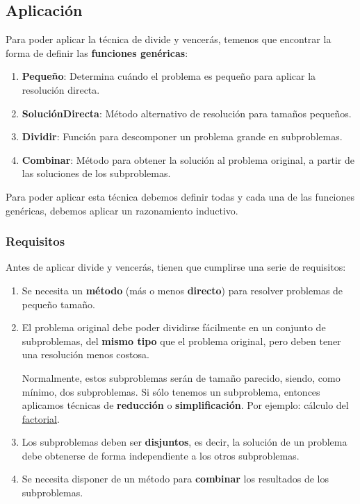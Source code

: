 \documentclass[10pt,a4paper,spanish]{report}
\theoremstyle{definition}
\theoremstyle{remark}
\begin{document}
\subsection{\textcolor[rgb]{0.2,0.5,0.5}Aplicación}
Para poder aplicar la técnica de divide y vencerás, temenos que encontrar la forma de definir las \textbf{\textcolor[rgb]{0.2,0.5,0.5}{funciones genéricas}}:

\begin{enumerate}[$\star$]
    \item \textbf{\textcolor[rgb]{0.2,0.5,0.5}{Pequeño}}: Determina cuándo el problema es pequeño para aplicar la resolución directa.
    \item \textbf{\textcolor[rgb]{0.2,0.5,0.5}{SoluciónDirecta}}: Método alternativo de resolución para tamaños pequeños.
    \item \textbf{\textcolor[rgb]{0.2,0.5,0.5}{Dividir}}: Función para descomponer un problema grande en subproblemas.
    \item \textbf{\textcolor[rgb]{0.2,0.5,0.5}{Combinar}}: Método para obtener la solución al problema original, a partir de las soluciones de los subproblemas.
\end{enumerate}

Para poder aplicar esta técnica debemos definir todas y cada una de las funciones genéricas, debemos aplicar un razonamiento inductivo.

\subsubsection{\textcolor[rgb]{0.2,0.5,0.5}Requisitos}

Antes de aplicar divide y vencerás, tienen que cumplirse una serie de requisitos:

\begin{enumerate}[$\star$]
    \item Se necesita un \textbf{\textcolor[rgb]{0.2,0.5,0.5}{método}} (más o menos \textbf{\textcolor[rgb]{0.2,0.5,0.5}{directo}}) para resolver problemas de pequeño tamaño.

    \item El problema original debe poder dividirse fácilmente en un conjunto de subproblemas, del \textbf{\textcolor[rgb]{0.2,0.5,0.5}{mismo tipo}} que el problema original, pero deben tener una resolución menos costosa.

    Normalmente, estos subproblemas serán de tamaño parecido, siendo, como mínimo, dos subproblemas. Si sólo tenemos un subproblema, entonces aplicamos técnicas de \textbf{\textcolor[rgb]{0.2,0.5,0.5}{reducción}} o \textbf{\textcolor[rgb]{0.2,0.5,0.5}{simplificación}}. Por ejemplo: cálculo del \hyperref[ej_factorial]{factorial}.

    \item Los subproblemas deben ser \textbf{\textcolor[rgb]{0.2,0.5,0.5}{disjuntos}}, es decir, la solución de un problema debe obtenerse de forma independiente a los otros subproblemas.

    \item Se necesita disponer de un método para \textbf{\textcolor[rgb]{0.2,0.5,0.5}{combinar}} los resultados de los subproblemas.
\end{enumerate}
\end{document}
